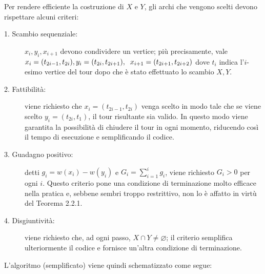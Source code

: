 Per rendere efficiente la costruzione di $X$ e $Y$, gli archi che vengono scelti devono rispettare alcuni criteri:
\begin{description}
    \item[1. Scambio sequenziale:] $x_i, y_i, x_{i+1}$ devono condividere un vertice; più precisamente, vale 
                $x_i=(t_{2i-1}, t_{2i}), \\y_i=(t_{2i}, t_{2i+1}),\;\; x_{i+1}=(t_{2i+1},t_{2i+2})$ dove $t_i$ indica
                l'$i$-esimo vertice del tour dopo che è stato effettuato lo scambio $X, Y$.

    \item[2. Fattibilità:] viene richiesto che $x_i=(t_{2i-1}, t_{2i})$ venga scelto in modo tale che se
                viene scelto $y_i = (t_{2i}, t_1)$, il tour risultante sia valido. In questo modo viene 
                garantita la possibilità di chiudere il tour in ogni momento, riducendo così il tempo di 
                esecuzione e semplificando il codice. 

    \item[3. Guadagno positivo:] detti $g_i = w(x_i)-w(y_i)$ e $G_i = \displaystyle\sum_{i=1}^{i}{g_i}$, viene 
                richiesto $G_i>0$ per ogni $i$. Questo criterio pone una condizione di terminazione molto 
                efficace nella pratica e, sebbene sembri troppo restrittivo, non lo è affatto in virtù del 
                Teorema 2.2.1.

    \item[4. Disgiuntività:] viene richiesto che, ad ogni passo, $X\cap{}Y\neq\varnothing$; il criterio 
                semplifica ulteriormente il codice e fornisce un'altra condizione di terminazione. 
\end{description}

L'algoritmo (semplificato) viene quindi schematizzato come segue:

